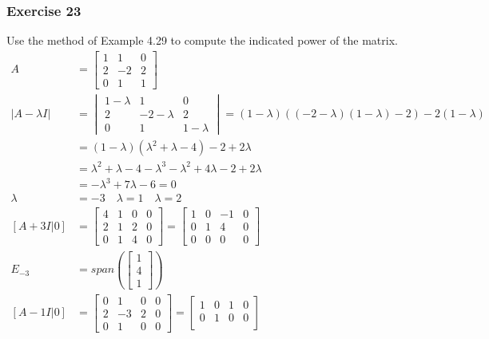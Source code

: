 \documentclass{math}
\begin{document}
\subsubsection*{Exercise 23}
Use the method of Example 4.29 to compute the indicated power of the matrix.
\begin{align*}
  A &= \begin{bmatrix}
    1 & 1 & 0 \\
    2 & -2 & 2 \\
    0 & 1 & 1
  \end{bmatrix} \\
  |A-\lambda I| &= \begin{vmatrix}
    1-\lambda & 1 & 0 \\
    2 & -2-\lambda & 2 \\
    0 & 1 & 1-\lambda
  \end{vmatrix} = (1-\lambda)((-2-\lambda)(1-\lambda)-2)-2(1-\lambda) \\
  &= (1-\lambda)(\lambda^2+\lambda-4)-2+2\lambda \\
  &= \lambda^2+\lambda-4-\lambda^3-\lambda^2+4\lambda-2+2\lambda \\
  &= -\lambda^3+7\lambda-6 = 0 \\
  \lambda &= -3 \quad \lambda = 1 \quad \lambda = 2 \\
  [A+3I|0] &= \begin{bmatrix}
    4 & 1 & 0 & 0 \\
    2 & 1 & 2 & 0 \\
    0 & 1 & 4 & 0
  \end{bmatrix} = \begin{bmatrix}
    1 & 0 & -1 & 0 \\
    0 & 1 & 4 & 0 \\
    0 & 0 & 0 & 0
  \end{bmatrix} \\
  E_{-3} &= span\left(\begin{bmatrix}1 \\ 4 \\ 1\end{bmatrix}\right) \\
  [A-1I|0] &= \begin{bmatrix}
    0 & 1 & 0 & 0 \\
    2 & -3 & 2 & 0 \\
    0 & 1 & 0 & 0
  \end{bmatrix} = \begin{bmatrix}
    1 & 0 & 1 & 0 \\
    0 & 1 & 0 & 0 \\

\end{bmatrix}
\end{align*}
\end{document}
